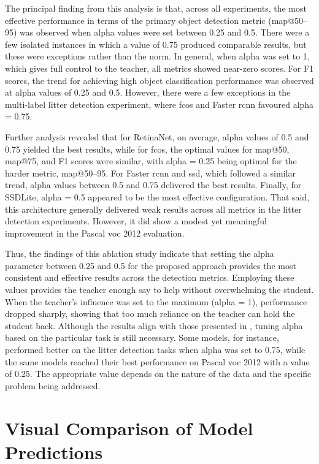 The principal finding from this analysis is that, across all experiments, the most effective performance in terms of the primary object detection metric (\gls{map}@50–95) was observed when \gls{alpha} values were set between 0.25 and 0.5. There were a few isolated instances in which a value of 0.75 produced comparable results, but these were exceptions rather than the norm. In general, when \gls{alpha} was set to 1, which gives full control to the teacher, all metrics showed near-zero scores. For F1 scores, the trend for achieving high object classification performance was observed at \gls{alpha} values of 0.25 and 0.5. However, there were a few exceptions in the multi-label litter detection experiment, where \gls{fcos} and Faster \gls{rcnn} favoured \gls{alpha} = 0.75. 

Further analysis revealed that for RetinaNet, on average, \gls{alpha} values of 0.5 and 0.75 yielded the best results, while for \gls{fcos}, the optimal values for \gls{map}@50, \gls{map}@75, and F1 scores were similar, with \gls{alpha} = 0.25 being optimal for the harder metric, \gls{map}@50–95. For Faster \gls{rcnn} and \gls{ssd}, which followed a similar trend, \gls{alpha} values between 0.5 and 0.75 delivered the best results. Finally, for SSDLite, \gls{alpha} = 0.5 appeared to be the most effective configuration. That said, this architecture generally delivered weak results across all metrics in the litter detection experiments. However, it did show a modest yet meaningful improvement in the Pascal \gls{voc} 2012 evaluation.

Thus, the findings of this ablation study indicate that setting the \gls{alpha} parameter between 0.25 and 0.5 for the proposed approach provides the most consistent and effective results across the detection metrics. Employing these values provides the teacher enough say to help without overwhelming the student. When the teacher’s influence was set to the maximum (\gls{alpha} = 1), performance dropped sharply, showing that too much reliance on the teacher can hold the student back. Although the results align with those presented in \cite{lab2wild}, tuning \gls{alpha} based on the particular task is still necessary. Some models, for instance, performed better on the litter detection tasks when \gls{alpha} was set to 0.75, while the same models reached their best performance on Pascal \gls{voc} 2012 with a value of 0.25. The appropriate value depends on the nature of the data and the specific problem being addressed.


\section{Visual Comparison of Model Predictions}
\label{sec:5_visual_results}

